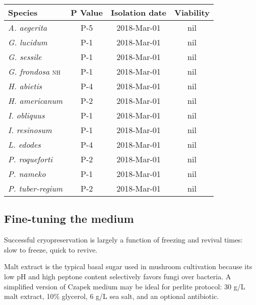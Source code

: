 \documentclass{article}
\begin{document}
\begin{center}
	\begin{tabular}{l|ccc}

\textbf{Species} & \textbf{P Value} & \textbf{Isolation date} & \textbf{Viability} \\
\hline

\emph{A. aegerita} & P-5 & 2018-Mar-01 & nil \\
\hline

\emph{G. lucidum} & P-1 & 2018-Mar-01 & nil \\
\emph{G. sessile} & P-1 & 2018-Mar-01 & nil \\
\hline

\emph{G. frondosa} \textsc{nh} & P-1 & 2018-Mar-01 & nil \\
\hline

\emph{H. abietis} & P-4 & 2018-Mar-01 & nil \\
\emph{H. americanum} & P-2 & 2018-Mar-01 & nil \\
\hline

\emph{I. obliquus} & P-1 & 2018-Mar-01 & nil \\
\hline

\emph{I. resinosum} & P-1 & 2018-Mar-01 & nil \\
\hline

\emph{L. edodes} & P-4 & 2018-Mar-01 & nil \\
\hline

\emph{P. roqueforti} & P-2 & 2018-Mar-01 & nil \\
\hline

\emph{P. nameko} & P-1 & 2018-Mar-01 & nil \\
\hline

\emph{P. tuber-regium} & P-2 & 2018-Mar-01 & nil \\

	\end{tabular}
\end{center}


\subsection{Fine-tuning the medium}

Successful cryopreservation is largely a function of freezing and revival times: slow to freeze, quick to revive.

Malt extract is the typical basal sugar used in mushroom cultivation because its low pH and high peptone content selectively favors fungi over bacteria.
A simplified version of Czapek medium may be ideal for perlite protocol: 30 g/L malt extract, 10\% glycerol, 6 g/L sea salt, and an optional antibiotic.
\end{document}
